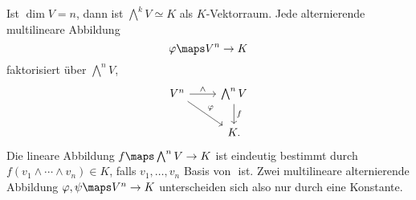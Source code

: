 \begin{bemerkung*}
  Ist \( \dim{V}=n \), dann ist \( \bigwedge^k V\simeq K \) als \( K \)-Vektorraum. Jede alternierende multilineare Abbildung
  \begin{equation*}
    \varphi\maps V^n \to K
  \end{equation*}
  faktorisiert über \( \bigwedge^n V \), \dh 
  \begin{equation*}
    \begin{tikzcd}
      V^n\arrow[r,"\wedge"]\arrow[dr,"\varphi"]&\bigwedge^n V\arrow[d,"f"]\\
      &K.
    \end{tikzcd}
  \end{equation*}
  Die lineare Abbildung \( f\maps \bigwedge^n V\to K \) ist eindeutig bestimmt durch \( f(v_1\wedge \dotsb \wedge v_n)\in K \), falls \( v_1,\dotsc, v_n \) Basis von \(  \) ist. Zwei multilineare alternierende Abbildung \( \varphi,\psi\maps V^n \to K \) unterscheiden sich also nur durch eine Konstante.
\end{bemerkung*}
